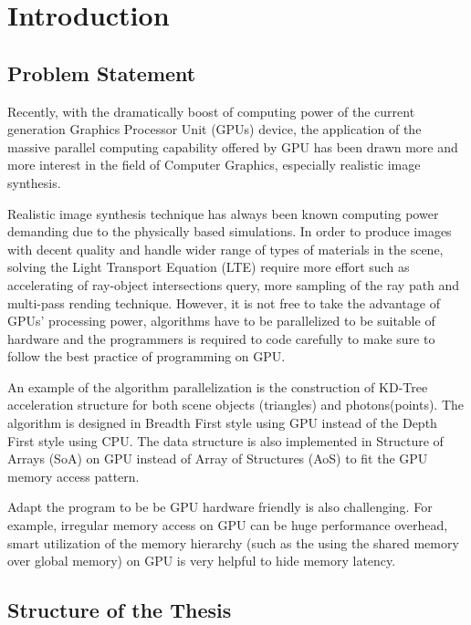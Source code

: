 \chapter{Introduction}

\section{Problem Statement}

Recently, with the dramatically boost of computing power of the current generation Graphics Processor Unit (GPUs) device, the application of the massive parallel computing capability offered by GPU has been drawn more and more interest in the field of Computer Graphics, especially realistic image synthesis.  

Realistic image synthesis technique has always been known computing power demanding due to the physically based simulations. In order to produce images with decent quality and handle wider range of types of materials in the scene, solving the Light Transport  Equation (LTE) require more effort such as accelerating of ray-object intersections query, more sampling of the ray path and multi-pass rending technique. However, it is not free to take the advantage of GPUs' processing power, algorithms have to be parallelized to be suitable of hardware and the programmers is required to code carefully to make sure to follow the best practice of programming on GPU. 

An example of the algorithm parallelization is the construction of KD-Tree acceleration structure for both scene objects (triangles) and photons(points). The algorithm is designed in Breadth First style using GPU instead of the Depth First style using CPU. The data structure is also implemented in Structure of Arrays (SoA) on GPU instead of Array of Structures (AoS) to fit the GPU memory access pattern. 

Adapt the program to be be GPU hardware friendly is also challenging. For example, irregular memory access on GPU can be huge performance overhead, smart utilization of the memory hierarchy (such as the using the shared memory over global memory) on GPU is very helpful to hide memory latency. 

\section{Structure of the Thesis}	
